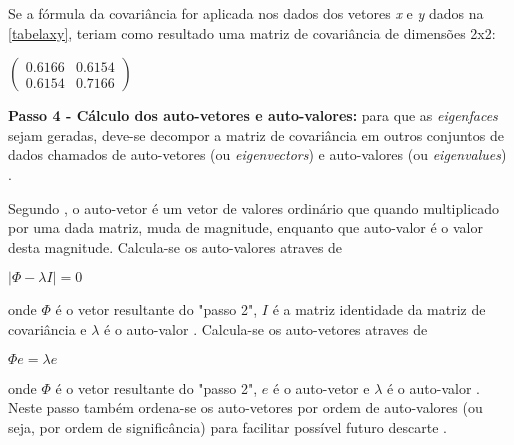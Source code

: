 



Se a fórmula da covariância for aplicada nos dados dos vetores \textit{x} e \textit{y} dados na \autoref{tabelaxy}, teriam como resultado uma matriz de covariância de dimensões 2x2:
\begin{center}
	$\begin{pmatrix} 0.6166 & 0.6154 \\ 0.6154 & 0.7166 \end{pmatrix}$
\end{center}

\textbf{Passo 4 - Cálculo dos auto-vetores e auto-valores:} para que as \textit{eigenfaces} sejam geradas, deve-se decompor a matriz de covariância em outros conjuntos de dados chamados de auto-vetores (ou \textit{eigenvectors}) e auto-valores (ou \textit{eigenvalues}) \cite{geysilva}.

Segundo \cite{drmathew_java_programming}, o auto-vetor é um vetor de valores ordinário que quando multiplicado por uma dada matriz, muda de magnitude, enquanto que auto-valor é o valor desta magnitude. Calcula-se os auto-valores atraves de 
 \begin{center}
 	$|\Phi - \lambda I| = 0$	
 \end{center}
onde $\Phi$ é o vetor resultante do "passo 2", $I$ é a matriz identidade da matriz de covariância e $\lambda$ é o auto-valor \cite{geysilva}. Calcula-se os auto-vetores atraves de 
\begin{center}
	$\Phi e = \lambda e$	
\end{center}
onde $\Phi$ é o vetor resultante do "passo 2", $e$ é o auto-vetor e $\lambda$ é o auto-valor \cite{geysilva}.
Neste passo também ordena-se os auto-vetores por ordem de auto-valores (ou seja, por ordem de significância) para facilitar possível futuro descarte \cite{geysilva}.

